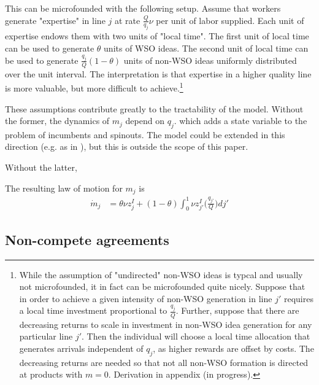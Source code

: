 \documentclass[12pt,english]{article}
\theoremstyle{remark}
\begin{document}
This can be microfounded with the following setup. Assume that workers generate "expertise" in line $j$ at rate $\frac{Q}{q_j} \nu$ per unit of labor supplied. Each unit of expertise endows them with two units of "local time". The first unit of local time can be used to generate $\theta$ units of WSO ideas. The second unit of local time can be used to generate $\frac{q_j}{Q}(1-\theta)$ units of non-WSO ideas uniformly distributed over the unit interval. The interpretation is that expertise in a higher quality line is more valuable, but more difficult to achieve.\footnote{While the assumption of "undirected" non-WSO ideas is typcal and usually not microfounded, it in fact can be microfounded quite nicely. Suppose that in order to achieve a given intensity of non-WSO generation in line $j'$ requires a local time investment proportional to $\frac{q_j}{Q}$. Further, suppose that there are decreasing returns to scale in investment in non-WSO idea generation for any particular line $j'$. Then the individual will choose a local time allocation that generates arrivals independent of $q_j$, as higher rewards are offset by costs. The decreasing returns are needed so that not all non-WSO formation is directed at products with $m = 0$. Derivation in appendix (in progress).}

These assumptions contribute greatly to the tractability of the model. Without the former, the dynamics of $m_j$ depend on $q_j$. which adds a state variable to the problem of incumbents and spinouts. The model could be extended in this direction (e.g. as in \cite{acemoglu_innovation_2015}), but this is outside the scope of this paper. 

Without the latter, 

The resulting law of motion for $m_j$ is 
\begin{align}
	\dot{m}_j &= \theta \nu z^I_j + (1-\theta) \int_0^1 \nu z^I_{j'} \Big(\frac{q_{j'}}{Q} \Big)dj' \label{m_law_of_motion}
\end{align}

\subsection{Non-compete agreements}
\end{document}
